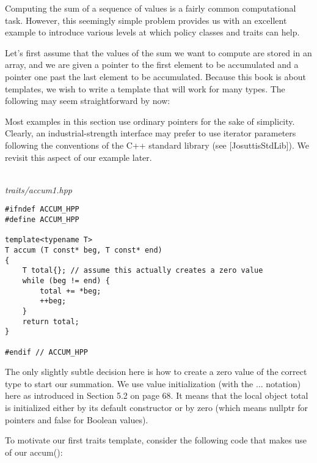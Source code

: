 
Computing the sum of a sequence of values is a fairly common computational task. However, this seemingly simple problem provides us with an excellent example to introduce various levels at which policy classes and traits can help.


Let’s first assume that the values of the sum we want to compute are stored in an array, and we are given a pointer to the first element to be accumulated and a pointer one past the last element to be accumulated. Because this book is about templates, we wish to write a template that will work for many types. The following may seem straightforward by now:

\begin{tcolorbox}[colback=webgreen!5!white,colframe=webgreen!75!black]
\hspace*{0.75cm}Most examples in this section use ordinary pointers for the sake of simplicity. Clearly, an industrial-strength interface may prefer to use iterator parameters following the conventions of the C++ standard library (see [JosuttisStdLib]). We revisit this aspect of our example later.
\end{tcolorbox}

\hspace*{\fill} \\ %
\noindent
\textit{traits/accum1.hpp}
\begin{lstlisting}[style=styleCXX]
#ifndef ACCUM_HPP
#define ACCUM_HPP

template<typename T>
T accum (T const* beg, T const* end)
{
	T total{}; // assume this actually creates a zero value
	while (beg != end) {
		total += *beg;
		++beg;
	}
	return total;
}

#endif // ACCUM_HPP
\end{lstlisting}

The only slightly subtle decision here is how to create a zero value of the correct type to start our summation. We use value initialization (with the {...} notation) here as introduced in Section 5.2 on page 68. It means that the local object total is initialized either by its default constructor or by zero (which means nullptr for pointers and false for Boolean values).

To motivate our first traits template, consider the following code that makes use of our accum():


